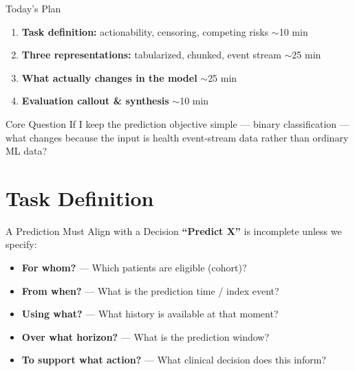 \documentclass[aspectratio=169,10pt]{beamer}
\begin{document}
\begin{frame}{Today's Plan}
\begin{enumerate}
    \item \textbf{Task definition:} actionability, censoring, competing risks \hfill\textcolor{columbiagray}{\scriptsize $\sim$10 min}
    \item \textbf{Three representations:} tabularized, chunked, event stream \hfill\textcolor{columbiagray}{\scriptsize $\sim$25 min}
    \item \textbf{What actually changes in the model} \hfill\textcolor{columbiagray}{\scriptsize $\sim$25 min}
    \item \textbf{Evaluation callout \& synthesis} \hfill\textcolor{columbiagray}{\scriptsize $\sim$10 min}
\end{enumerate}
\vspace{0.5em}
\begin{block}{Core Question}
If I keep the prediction objective simple --- binary classification --- what changes because the input is health event-stream data rather than ordinary ML data?
\end{block}
\end{frame}

\section{Task Definition}

\begin{frame}{A Prediction Must Align with a Decision}
\textbf{``Predict X''} is incomplete unless we specify:
\begin{itemize}[<+->]
    \item \textbf{For whom?} --- Which patients are eligible (cohort)?
    \item \textbf{From when?} --- What is the prediction time / index event?
    \item \textbf{Using what?} --- What history is available at that moment?
    \item \textbf{Over what horizon?} --- What is the prediction window?
    \item \textbf{To support what action?} --- What clinical decision does this inform?
\end{itemize}
\end{frame}
\end{document}
